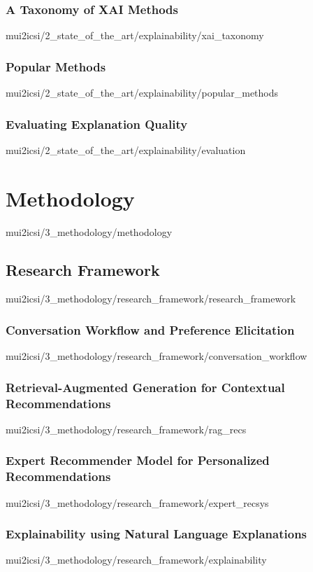 \documentclass[english,epsbased,copyright,final,printable,covers,extendedindex,firstnumbered,tfm,gnuplot,loc,loe,lof,lot]{tfgtfmthesisuam}
\begin{document}
      \subsection{A Taxonomy of XAI Methods\label{SS:XAITAXONOMY}}{mui2icsi/2_state_of_the_art/explainability/xai_taxonomy}
      \subsection{Popular Methods\label{SS:POPMETHODS}}{mui2icsi/2_state_of_the_art/explainability/popular_methods}
      \subsection{Evaluating Explanation Quality\label{SS:EVALEXPLAIN}}{mui2icsi/2_state_of_the_art/explainability/evaluation}

  \chapter{Methodology\label{CAP:METHODOLOGY}}{mui2icsi/3_methodology/methodology}
    \section{Research Framework\label{SEC:RESEARCHFW}}{mui2icsi/3_methodology/research_framework/research_framework}
      \subsection{Conversation Workflow and Preference Elicitation\label{SS:CONVPREF}}{mui2icsi/3_methodology/research_framework/conversation_workflow}
      \subsection{Retrieval-Augmented Generation for Contextual Recommendations\label{SS:RAGRECS}}{mui2icsi/3_methodology/research_framework/rag_recs}
      \subsection{Expert Recommender Model for Personalized Recommendations\label{SS:EXPERTRECSYS}}{mui2icsi/3_methodology/research_framework/expert_recsys}
      \subsection{Explainability using Natural Language Explanations\label{SS:EXPLAINNLE}}{mui2icsi/3_methodology/research_framework/explainability}
\end{document}

